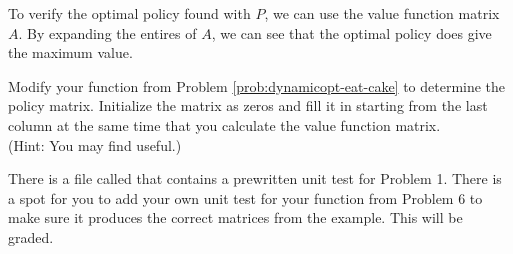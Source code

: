  To verify the optimal policy found with $P$, we can use the value function matrix $A$.
By expanding the entires of $A$, we can see that the optimal policy does give the maximum value.


\begin{center}
\end{center}


\begin{problem}
Modify your function from Problem \ref{prob:dynamicopt-eat-cake} to determine the policy matrix.
Initialize the matrix as zeros and fill it in starting from the last column at the same time that you calculate the value function matrix.
\\(Hint: You may find  useful.)
\end{problem}

\begin{unittest}
There is a file called  that contains a prewritten unit test for Problem 1.
There is a spot for you to add your own unit test for your function from Problem 6 to make sure it produces the correct matrices from the example.
This will be graded.
\end{unittest}


